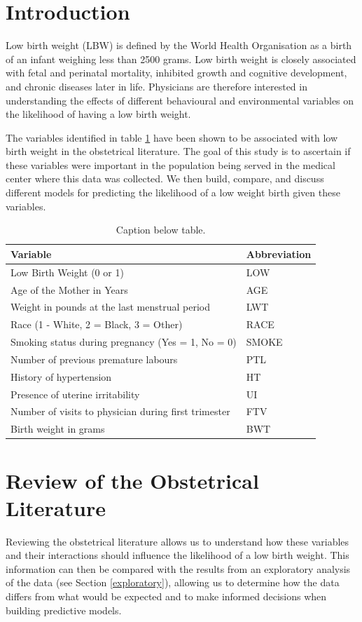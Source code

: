 \newpage

\section{Introduction}
Low birth weight (LBW) is defined by the World Health Organisation as a birth of an infant weighing less than 2500 grams. Low birth weight is closely associated with fetal and perinatal mortality, inhibited growth and cognitive development, and chronic diseases later in life. Physicians are therefore interested in understanding the effects of different behavioural and environmental variables on the likelihood of having a low birth weight.

The variables identified in table \ref{tab:variables} have been shown to be associated with low birth weight in the obstetrical literature. The goal of this study is to ascertain if these variables were important in the population being served in the medical center where this data was collected. We then build, compare, and discuss different models for predicting the likelihood of a low weight birth given these variables. 

\vspace{0.3cm}
\renewcommand\arraystretch{1.2}
\begin{table}[ht]
\centering
\begin{tabular}[t]{ll}
\toprule
Variable & Abbreviation \\
\midrule
Low Birth Weight (0 or 1) & LOW \\
Age of the Mother in Years & AGE \\
Weight in pounds at the last menstrual period & LWT \\
Race (1 - White, 2 = Black, 3 = Other) & RACE \\
Smoking status during pregnancy (Yes = 1, No = 0) & SMOKE \\
Number of previous premature labours & PTL \\
History of hypertension & HT \\
Presence of uterine irritability & UI \\
Number of visits to physician during first trimester & FTV \\
Birth weight in grams & BWT \\
\bottomrule
\end{tabular}
\caption{Caption below table.}
\label{tab:variables}
\end{table}%

\section{Review of the Obstetrical Literature}
Reviewing the obstetrical literature allows us to understand how these variables and their interactions should influence the likelihood of a low birth weight. This information can then be compared with the results from an exploratory analysis of the data (see Section \ref{exploratory}), allowing us to determine how the data differs from what would be expected and to make informed decisions when building predictive models.

